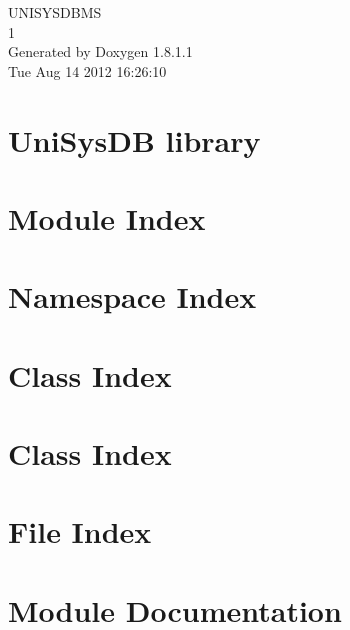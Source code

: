 \documentclass{book}
\begin{document}
\hypersetup{pageanchor=false,citecolor=blue}
\begin{titlepage}
\vspace*{7cm}
\begin{center}
{\Large U\-N\-I\-S\-Y\-S\-D\-B\-M\-S \\[1ex]\large 1 }\\
\vspace*{1cm}
{\large Generated by Doxygen 1.8.1.1}\\
\vspace*{0.5cm}
{\small Tue Aug 14 2012 16:26:10}\\
\end{center}
\end{titlepage}
\clearemptydoublepage
{}
\tableofcontents
\clearemptydoublepage
{}
\hypersetup{pageanchor=true,citecolor=blue}
\chapter{Uni\-Sys\-D\-B library}
\label{index}\hypertarget{index}{}
\chapter{Module Index}

\chapter{Namespace Index}

\chapter{Class Index}

\chapter{Class Index}

\chapter{File Index}

\chapter{Module Documentation}













\end{document}
